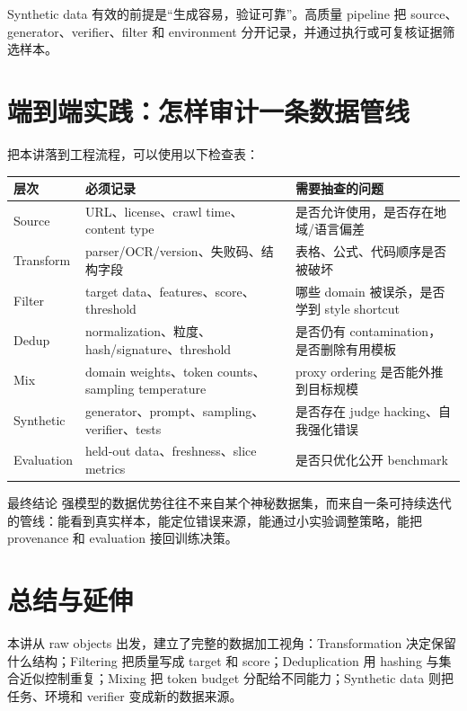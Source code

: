 \documentclass[a4paper]{article}
\begin{document}
Synthetic data 有效的前提是“生成容易，验证可靠”。高质量 pipeline 把 source、generator、verifier、filter 和 environment 分开记录，并通过执行或可复核证据筛选样本。

\section{端到端实践：怎样审计一条数据管线}

把本讲落到工程流程，可以使用以下检查表：

\begin{longtable}{L{0.17\textwidth}L{0.35\textwidth}L{0.38\textwidth}}
\toprule
层次 & 必须记录 & 需要抽查的问题 \\
\midrule
Source & URL、license、crawl time、content type & 是否允许使用，是否存在地域/语言偏差 \\
Transform & parser/OCR/version、失败码、结构字段 & 表格、公式、代码顺序是否被破坏 \\
Filter & target data、features、score、threshold & 哪些 domain 被误杀，是否学到 style shortcut \\
Dedup & normalization、粒度、hash/signature、threshold & 是否仍有 contamination，是否删除有用模板 \\
Mix & domain weights、token counts、sampling temperature & proxy ordering 是否能外推到目标规模 \\
Synthetic & generator、prompt、sampling、verifier、tests & 是否存在 judge hacking、自我强化错误 \\
Evaluation & held-out data、freshness、slice metrics & 是否只优化公开 benchmark \\
\bottomrule
\end{longtable}

\begin{importantbox}{最终结论}
强模型的数据优势往往不来自某个神秘数据集，而来自一条可持续迭代的管线：能看到真实样本，能定位错误来源，能通过小实验调整策略，能把 provenance 和 evaluation 接回训练决策。
\end{importantbox}

\section{总结与延伸}

本讲从 raw objects 出发，建立了完整的数据加工视角：Transformation 决定保留什么结构；Filtering 把质量写成 target 和 score；Deduplication 用 hashing 与集合近似控制重复；Mixing 把 token budget 分配给不同能力；Synthetic data 则把任务、环境和 verifier 变成新的数据来源。
\end{document}
